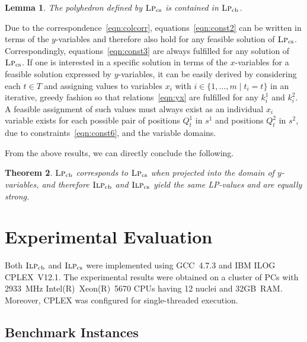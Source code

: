 \documentclass[11pt,a4paper]{article}
\newcommand{\MIPorig}{\textsc{Ilp}_{\mathrm{cb}}}
\newcommand{\MIPalt}{\textsc{Ilp}_{\mathrm{cs}}}
\newcommand{\LPorig}{\textsc{Lp}_{\mathrm{cb}}}
\newcommand{\LPalt}{\textsc{Lp}_{\mathrm{cs}}}
\newtheorem{theorem}{Theorem}[section]
\newtheorem{lemma}[theorem]{Lemma}
\newenvironment{proof}[1][Proof]{\begin{trivlist}
\item[\hskip \labelsep {\bfseries #1}]}{\end{trivlist}}
\begin{document}
\begin{lemma}
The polyhedron defined by $\LPalt$ is contained in $\LPorig$.
\end{lemma}
\begin{proof}
Due to the correspondence~\eqref{eqn:colcorr},
equations~\eqref{eqn:const2} can be written in terms of the
$y$-variables and therefore also hold for any feasible solution of $\LPalt$.
Correspondingly, equations~\eqref{eqn:const3} are always fulfilled for
any solution of $\LPalt$.
If one is interested in a specific solution in terms of the
$x$-variables for a feasible solution expressed by $y$-variables, 
it can be easily derived by considering
each $t\in T$ and assigning values to variables $x_i$ with
$i\in\{1,\ldots,m \mid t_i=t\}$ in an iterative, greedy fashion 
so that relations~\eqref{eqn:yx} are fulfilled for any $k^1_i$ and $k^2_i$. 
A feasible assignment of such values must always exist
as an individual $x_i$ variable exists for each possible pair 
of positions $Q^1_t$ in $s^1$ and positions $Q^2_t$ in $s^2$,
due to constraints~\eqref{eqn:const6}, and the variable domains.
\end{proof}

From the above results, we can directly conclude the following.
\begin{theorem}
$\LPorig$ corresponds to $\LPalt$ when projected into the domain of
$y$-variables, and therefore $\MIPorig$ and $\MIPalt$ yield the same
LP-values and are equally strong.
\end{theorem}


\section{Experimental Evaluation}
\label{sec:experiments}

Both $\MIPorig$ and $\MIPalt$ were implemented using GCC~4.7.3
and IBM ILOG CPLEX~V12.1. The experimental results were obtained on a
cluster of PCs with 2933~MHz Intel(R)~Xeon(R)~5670 CPUs having 12 nuclei 
and 32GB~RAM. Moreover, CPLEX was configured for single-threaded execution.

\subsection{Benchmark Instances}
\end{document}
